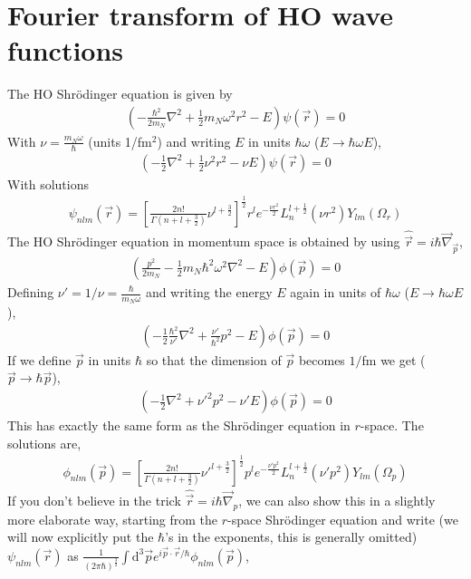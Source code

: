 \documentclass[10pt]{article}
\begin{document}
\section{Fourier transform of HO wave functions}
\label{sec:ft_transforms}
The HO Shr\"odinger equation is given by
\begin{align*}
\left( -\frac{\hbar^{2}}{2 m_N} \nabla^{2} + \frac{1}{2} m_N \omega^{2} r^{2} - E  \right) \psi(\vec{r}) = 0
\end{align*}
With $\nu = \frac{m_N \omega}{\hbar}$ (units 1/fm$^{2}$) and writing $E$ in units $\hbar \omega$ ($E \rightarrow \hbar \omega E$),
\begin{align*}
\left( -\frac{1}{2} \nabla^{2} + \frac{1}{2} \nu^{2} r^{2} - \nu E  \right) \psi(\vec{r}) = 0
\end{align*}
With solutions
\begin{align*}
	\psi_{n l m}(\vec{r}) = \left[ \frac{ 2n!}{\Gamma(n+l+\frac{3}{2})} \nu^{l+\frac{3}{2}} \right]^{\frac{1}{2}} r^{l} e^{-\frac{\nu r^{2}}{2}} L_{n}^{l+\frac{1}{2}}( \nu r^{2}) Y_{l m}(\Omega_{r})
\end{align*}
The HO Shr\"odinger equation in momentum space is obtained by using $\hat{\vec{r}} = i \hbar \vec{\nabla}_{\vec{p}}$,
\begin{align*}
\left( \frac{p^{2}}{2 m_N} - \frac{1}{2} m_N \hbar^{2} \omega^{2} \nabla^{2} - E  \right) \phi(\vec{p}) = 0 
\end{align*}
Defining $\nu' = 1/\nu = \frac{\hbar}{m_N \omega}$ and writing the energy $E$ again in units of $\hbar \omega$ ($E \rightarrow \hbar \omega E$),
\begin{align*}
\left(- \frac{1}{2} \frac{\hbar^{2}}{\nu'} \nabla^{2} + \frac{\nu'}{\hbar^{2}} p^{2}  - E  \right) \phi(\vec{p}) = 0 
\end{align*}
If we define $\vec{p}$ in units $\hbar$ so that the dimension of $\vec{p}$ becomes $1/$fm we get ($\vec{p} \rightarrow \hbar \vec{p}$),
\begin{align*}
\left(- \frac{1}{2} \nabla^{2} + \nu'^{2} p^{2}  - \nu' E  \right) \phi(\vec{p}) = 0 
\end{align*}
This has exactly the same form as the Shr\"odinger equation in $r$-space. The solutions are,
\begin{align*}
	\phi_{n l m}(\vec{p}) = \left[ \frac{ 2n!}{\Gamma(n+l+\frac{3}{2})} \nu'^{l+\frac{3}{2}} \right]^{\frac{1}{2}} p^{l} e^{-\frac{\nu' p^{2}}{2}} L_{n}^{l+\frac{1}{2}}( \nu' p^{2}) Y_{l m}(\Omega_{p})
\end{align*}
If you don't believe in the trick $\hat{\vec{r}} = i \hbar \vec{\nabla}_{p}$, we can also show this in a slightly more elaborate way, starting from the $r$-space Shr\"odinger equation and write (we will now explicitly put the $\hbar$'s in the exponents, this is generally omitted) $\psi_{n l m}(\vec{r})$ as $ \frac{1}{(2\pi \hbar)^{\frac{3}{2}}} \int \textrm{d}^{3} \vec{p} e^{i \vec{p} \cdot \vec{r} / \hbar} \phi_{n l m}(\vec{p})$,
\end{document}
